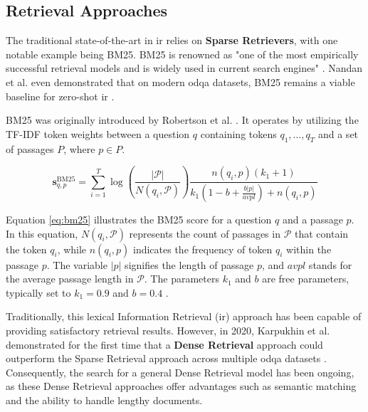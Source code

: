 
\subsection{Retrieval Approaches}
\label{subsec:qa_retrieval}

The traditional state-of-the-art in \gls{ir} relies on \textbf{Sparse Retrievers}, with one notable example being BM25. BM25 is renowned as "one of the most empirically successful retrieval models and is widely used in current search engines" \cite{zhu_retrieving_2021}. Nandan et al. even demonstrated that on modern \gls{odqa} datasets, BM25 remains a viable baseline for zero-shot \gls{ir} \cite{thakur_beir_2021}.

BM25 was originally introduced by Robertson et al. \cite{robertson_probabilistic_2009}. It operates by utilizing the TF-IDF token weights between a question $q$ containing tokens $q_1, \ldots, q_T$ and a set of passages $P$, where $p \in P$.

\begin{equation}
    \mathbf{s}_{q, p}^{\text{BM25}}=\sum_{i=1}^T \log \left(\frac{|\mathcal{P}|}{N\left(q_i, \mathcal{P}\right)}\right) \frac{n\left(q_i, p\right)\left(k_1+1\right)}{k_1\left(1-b+\frac{b|p|}{a v p l}\right)+n\left(q_i, p\right)}
    \label{eq:bm25}
\end{equation}

    
Equation \ref{eq:bm25} illustrates the BM25 score for a question $q$ and a passage $p$. In this equation, $N\left(q_i, \mathcal{P}\right)$ represents the count of passages in $\mathcal{P}$ that contain the token $q_i$, while $n\left(q_i, p\right)$ indicates the frequency of token $q_i$ within the passage $p$. The variable $|p|$ signifies the length of passage $p$, and $avpl$ stands for the average passage length in $\mathcal{P}$. The parameters $k_1$ and $b$ are free parameters, typically set to $k_1 = 0.9$ and $b = 0.4$ \cite{mcdonald_detect_2022,robertson_probabilistic_2009}.

Traditionally, this lexical Information Retrieval (\gls{ir}) approach has been capable of providing satisfactory retrieval results. However, in 2020, Karpukhin et al. demonstrated for the first time that a \textbf{Dense Retrieval} approach could outperform the Sparse Retrieval approach across multiple \gls{odqa} datasets \cite{karpukhin_dense_2020}. Consequently, the search for a general Dense Retrieval model has been ongoing, as these Dense Retrieval approaches offer advantages such as semantic matching and the ability to handle lengthy documents.

